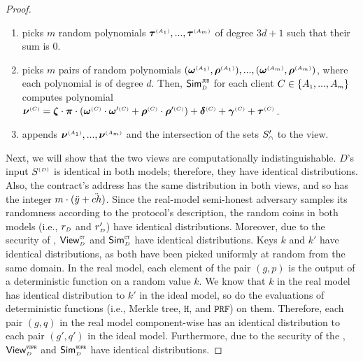 \begin{proof}
\begin{enumerate}
\item picks $m$ random polynomials $ {\bm\tau}^{\scriptscriptstyle (A_1)}, ...,  {\bm\tau}^{\scriptscriptstyle (A_m)}$ of degree $3d+1$ such that their sum is $0$.  


\item picks $m$ pairs of random polynomials $( {\bm\omega}^{\scriptscriptstyle (A_1)},  {\bm\rho}^{\scriptscriptstyle (A_1)}),..., ( {\bm\omega}^{\scriptscriptstyle (A_m)},  {\bm\rho}^{\scriptscriptstyle (A_m)})$, where each polynomial is of degree $d$. Then, $\mathsf{Sim}^{\scriptscriptstyle \mathtt{JUS}}_{\scriptscriptstyle D}$ for each client $C\in  \{  {  A}_{ \scriptscriptstyle {   1}}, ...,   {  A}_{ \scriptscriptstyle {   m}}\} $ computes polynomial $ {\bm\nu}^{\scriptscriptstyle (C)}= {\bm\zeta}\cdot {\bm\pi}\cdot(  {\bm\omega}^{\scriptscriptstyle (C)}\cdot  {\bm\omega}'^{\scriptscriptstyle (C)}+  {\bm\rho}^{\scriptscriptstyle (C)}\cdot  {\bm\rho}'^{\scriptscriptstyle (C)})+ {\bm\delta}^{\scriptscriptstyle (C)}+ {\bm\gamma}^{\scriptscriptstyle(C)}+  {\bm\tau}^{ \scriptscriptstyle {  {(C)}}}$. 
%
\item appends $ {\bm\nu}^{\scriptscriptstyle (A_1)},...,  {\bm\nu}^{\scriptscriptstyle (A_m)}$ and the intersection of the sets $S'_{\scriptscriptstyle \cap}$ to the view. 
%
\end{enumerate}
 

 Next, we will show that the two views are computationally indistinguishable. $D$'s input $S^{\scriptscriptstyle (D)}$ is
 identical in both models; therefore, they have identical distributions. Also, the contract's address has the same distribution in both views, and so has the integer $ m\cdot(\ddot{y}+\ddot{ch})$. Since the real-model semi-honest adversary samples its randomness according to the protocol’s description, the random coins in both models (i.e., $r_{\scriptscriptstyle D}$  and $r'_{\scriptscriptstyle D}$) have identical distributions. Moreover, due to the security of  \ct, $\mathsf{View}^{\scriptscriptstyle \mathtt{CT}}_{\scriptscriptstyle D}$ and $\mathsf{Sim}^{\scriptscriptstyle \mathtt{CT}}_{\scriptscriptstyle D}$ have identical distributions. Keys $k$ and $  k'$ have identical distributions, as both have been picked uniformly at random from the same domain.  In the real model, each element of the pair $(g, p)$ is the output of a deterministic function on a random value $k$. We know that $k$ in the real model has identical distribution to $  k'$ in the ideal model, so do the evaluations of deterministic functions (i.e., Merkle tree, $\mathtt{H}$, and $\mathtt {PRF}$) on them. Therefore, each pair $(g, q)$ in the real model component-wise has an identical distribution to each pair $(g', q')$ in the ideal model.  
 Furthermore, due to the security of the \vopr, $\mathsf{View}^{\scriptscriptstyle \mathtt{VOPR}}_{\scriptscriptstyle D}$ and $\mathsf{Sim}^{\scriptscriptstyle \mathtt{VOPR}}_{\scriptscriptstyle D}$ have identical distributions.
 

\end{proof}
